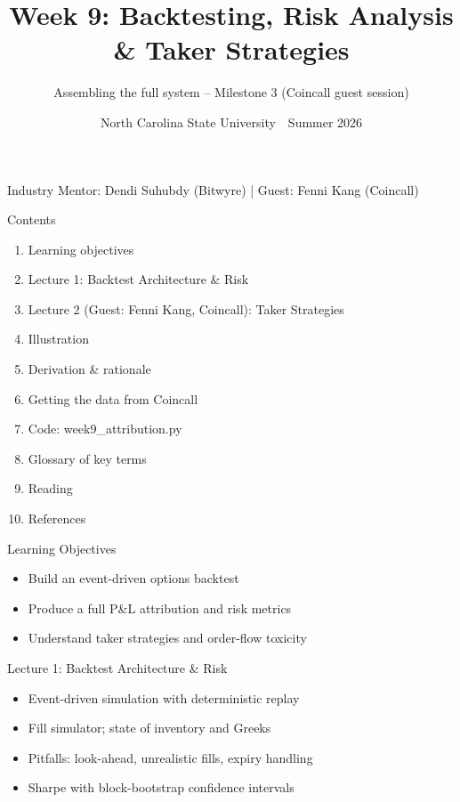\documentclass[aspectratio=169,10pt]{beamer}
\title{Week 9: Backtesting, Risk Analysis \& Taker Strategies}
\subtitle{Assembling the full system -- Milestone 3 (Coincall guest session)}
\date{North Carolina State University \,\textbar\, Summer 2026}
\begin{document}
\begin{frame}[plain]\titlepage\begin{center}\tiny Industry Mentor: Dendi Suhubdy (Bitwyre)  |  Guest: Fenni Kang (Coincall)\end{center}\end{frame}
\begin{frame}{Contents}
\small\begin{enumerate}\setlength{\itemsep}{3pt}
  \item Learning objectives
  \item Lecture 1: Backtest Architecture \& Risk
  \item Lecture 2 (Guest: Fenni Kang, Coincall): Taker Strategies
  \item Illustration
  \item Derivation \& rationale
  \item Getting the data from Coincall
  \item Code: week9\_attribution.py
  \item Glossary of key terms
  \item Reading
  \item References
\end{enumerate}
\end{frame}

\begin{frame}{Learning Objectives}
\begin{itemize}
  \item Build an event-driven options backtest
  \item Produce a full P\&L attribution and risk metrics
  \item Understand taker strategies and order-flow toxicity
\end{itemize}
\end{frame}

\begin{frame}{Lecture 1: Backtest Architecture \& Risk}
\begin{itemize}
  \item Event-driven simulation with deterministic replay
  \item Fill simulator; state of inventory and Greeks
  \item Pitfalls: look-ahead, unrealistic fills, expiry handling
  \item Sharpe with block-bootstrap confidence intervals
\end{itemize}
\end{frame}
\end{document}
